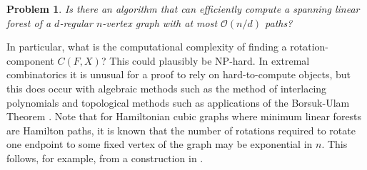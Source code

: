 \documentclass[11pt]{article}
\let\oldbibliography
\renewcommand{}[1]{
  {

    \hypersetup{linkcolor=cred}
    
    \oldbibliography{#1}
  }
}
\theoremstyle{plain}
\newtheorem{problem}[theorem]{Problem}
\theoremstyle{definition}
\newcommand{\cO}{\mathcal O}
\begin{document}
\begin{problem}\label{prob:linearforestefficientalgorithm}
    Is there an algorithm that can efficiently compute a spanning linear forest of a $d$-regular $n$-vertex graph with at most $\cO(n/d)$ paths?
\end{problem}

In particular, what is the computational complexity of finding a rotation-component $C(F,X)$? This could plausibly be NP-hard. In extremal combinatorics it is unusual for a proof to rely on hard-to-compute objects, but this does occur with algebraic methods such as the method of interlacing polynomials \cite{marcus2013interlacing,marcus2015interlacing} and topological methods such as applications of the Borsuk-Ulam Theorem \cite{matouvsek2003using}. Note that for Hamiltonian cubic graphs where minimum linear forests are Hamilton paths, it is known that the number of rotations required to rotate one endpoint to some fixed vertex of the graph may be exponential in $n$. This follows, for example, from a construction in \cite{brianski2022short}.


\end{document}

